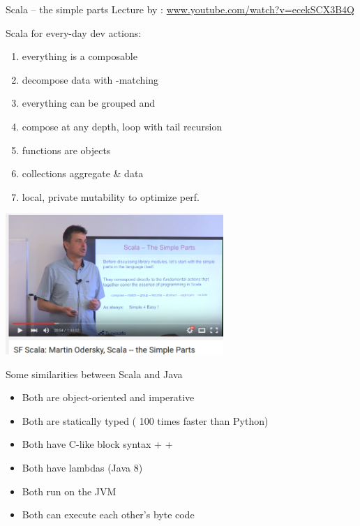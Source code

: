 \documentclass{lecturenotes}
\begin{document}
\begin{Slide}{Scala -- the simple parts}
\fontsize{9}{11}\selectfont
Lecture by : \href{https://www.youtube.com/watch?v=ecekSCX3B4Q}{www.youtube.com/watch?v=ecekSCX3B4Q}

\begin{multicols}{2}
\fontsize{9}{11}\selectfont
Scala for every-day dev actions:

\begin{enumerate}
\item {} everything is a composable 
\item {} decompose data with -matching
\item {} everything can be grouped and 
\item {} compose at any depth, loop with tail recursion
\item {} functions are objects
\item {} collections aggregate \&  data
\item {} local, private mutability to optimize perf.
\end{enumerate}

\columnbreak

\includegraphics[width=0.62\textwidth]{img/odersky}

\end{multicols}
\end{Slide}

\begin{Slide}{Some similarities between Scala and Java}
\begin{itemize}
\item Both are object-oriented and imperative
\item Both are statically typed (\code{~} 100 times faster than Python)
\item Both have C-like block syntax \code+{ }+
\item Both have lambdas (Java 8)
\item Both run on the JVM
\item Both can execute each other's byte code
\end{itemize}
\end{Slide}
\end{document}
